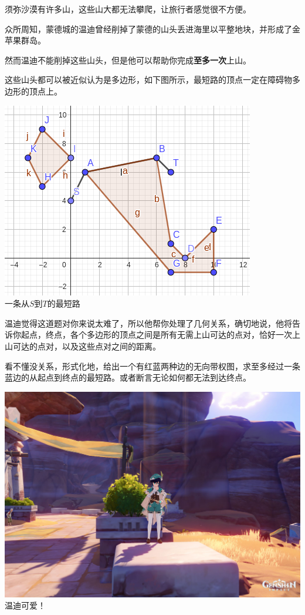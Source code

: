 须弥沙漠有许多山，这些山大都无法攀爬，让旅行者感觉很不方便。

众所周知，蒙德城的温迪曾经削掉了蒙德的山头丢进海里以平整地块，并形成了金苹果群岛。

然而温迪不能削掉这些山头，但是他可以帮助你完成\textbf{至多一次}上山。

这些山头都可以被近似认为是多边形，如下图所示，最短路的顶点一定在障碍物多边形的顶点上。

\begin{center}
  \includegraphics[scale=0.8]{example.png} \\
  \small{一条从$S$到$T$的最短路}
\end{center}

温迪觉得这道题对你来说太难了，所以他帮你处理了几何关系，确切地说，他将告诉你起点，终点，各个多边形的顶点之间是所有无需上山可达的点对，恰好一次上山可达的点对，以及这些点对之间的距离。

看不懂没关系，形式化地，给出一个有红蓝两种边的无向带权图，求至多经过一条蓝边的从起点到终点的最短路。或者断言无论如何都无法到达终点。

\begin{center}
  \includegraphics[scale=0.15]{venti.jpg} \\
  \small{温迪可爱！}
\end{center}
